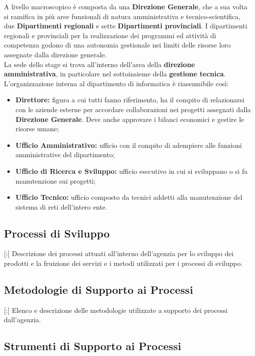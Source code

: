 A livello macroscopico è composta da una \textbf{Direzione Generale}, che a sua volta si ramifica in più aree funzionali di natura amministrativa e tecnico-scientifica, due \textbf{Dipartimenti regionali} e sette \textbf{Dipartimenti provinciali}. I dipartimenti regionali e provinciali per la realizzazione dei programmi ed attività di competenza godono di una autonomia gestionale nei limiti delle risorse loro assegnate dalla direzione generale.\\
La sede dello stage si trova all'interno dell'area della \textbf{direzione amministrativa}, in particolare nel sottoinsieme della \textbf{gestione tecnica}.\\
L'organizzazione interna al dipartimento di informatica è riassumibile così:
\begin{itemize}

	\item \textbf{Direttore:} figura a cui tutti fanno riferimento, ha il compito di relazionarsi con le aziende esterne per accordare collaborazioni nei progetti assegnati dalla \textbf{Direzione Generale}. Deve anche approvare i bilanci economici e gestire le risorse umane;
	\item \textbf{Ufficio Amministrativo:} ufficio con il compito di adempiere alle funzioni amministrative del dipartimento;
	\item \textbf{Ufficio di Ricerca e Sviluppo:} ufficio esecutivo in cui si sviluppano o si fa manutenzione sui progetti;
	\item \textbf{Ufficio Tecnico:} ufficio composto da tecnici addetti alla manutenzione del sistema di reti dell'intero ente.
	
\end{itemize}
\subsection{Processi di Sviluppo}

[:] Descrizione dei processi attuati all'interno dell'agenzia per lo sviluppo dei prodotti e la fruizione dei servizi e i metodi utilizzati per i processi di sviluppo.

\subsection{Metodologie di Supporto ai Processi}

[:] Elenco e descrizione delle metodologie utilizzate a supporto dei processi dall'agenzia.

\subsection{Strumenti di Supporto ai Processi}

